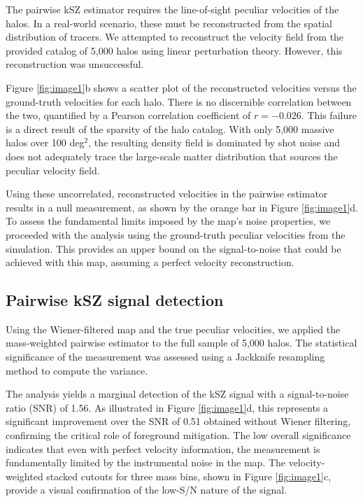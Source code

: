 \documentclass[]{article}
\begin{document}
The pairwise kSZ estimator requires the line-of-sight peculiar velocities of the halos. In a real-world scenario, these must be reconstructed from the spatial distribution of tracers. We attempted to reconstruct the velocity field from the provided catalog of 5,000 halos using linear perturbation theory. However, this reconstruction was unsuccessful.

Figure \ref{fig:image1}b shows a scatter plot of the reconstructed velocities versus the ground-truth velocities for each halo. There is no discernible correlation between the two, quantified by a Pearson correlation coefficient of $r = -0.026$. This failure is a direct result of the sparsity of the halo catalog. With only 5,000 massive halos over 100 deg$^2$, the resulting density field is dominated by shot noise and does not adequately trace the large-scale matter distribution that sources the peculiar velocity field.

Using these uncorrelated, reconstructed velocities in the pairwise estimator results in a null measurement, as shown by the orange bar in Figure \ref{fig:image1}d. To assess the fundamental limits imposed by the map's noise properties, we proceeded with the analysis using the ground-truth peculiar velocities from the simulation. This provides an upper bound on the signal-to-noise that could be achieved with this map, assuming a perfect velocity reconstruction.

\subsection{Pairwise kSZ signal detection}

Using the Wiener-filtered map and the true peculiar velocities, we applied the mass-weighted pairwise estimator to the full sample of 5,000 halos. The statistical significance of the measurement was assessed using a Jackknife resampling method to compute the variance.

The analysis yields a marginal detection of the kSZ signal with a signal-to-noise ratio (SNR) of 1.56. As illustrated in Figure \ref{fig:image1}d, this represents a significant improvement over the SNR of 0.51 obtained without Wiener filtering, confirming the critical role of foreground mitigation. The low overall significance indicates that even with perfect velocity information, the measurement is fundamentally limited by the instrumental noise in the map. The velocity-weighted stacked cutouts for three mass bins, shown in Figure \ref{fig:image1}c, provide a visual confirmation of the low-S/N nature of the signal.
\end{document}
